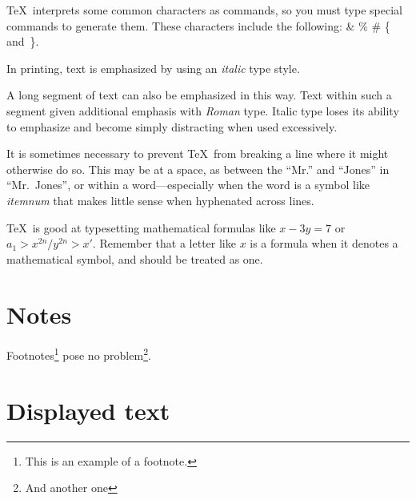 \documentclass[dvips,aoas,preprint]{imsart}
\numberwithin{equation}{section}
\theoremstyle{plain}
\begin{document}
\TeX\ interprets some common characters as commands, so you must type
special commands to generate them.  These characters include the
following:
        \& \% \# \{ and~\}.

In printing, text is emphasized by using an
       {\em italic\/}  %
type style.

\begin{em}
   A long segment of text can also be emphasized in this way.  Text within
   such a segment given additional emphasis
      with\/ {\em Roman}
   type.  Italic type loses its ability to emphasize and become simply
   distracting when used excessively.
\end{em}

It is sometimes necessary to prevent \TeX\ from breaking a line where
it might otherwise do so.  This may be at a space, as between the
``Mr.'' and ``Jones'' in
       ``Mr.~Jones'',        %
or within a word---especially when the word is a symbol like
       \mbox{\em itemnum\/}
that makes little sense when hyphenated across
       lines.

\TeX\ is good at typesetting mathematical formulas like
       \( x-3y = 7 \)
or
       \( a_{1} > x^{2n} / y^{2n} > x' \).
Remember that a letter like
       $x$        %
is a formula when it denotes a mathematical symbol, and should
be treated as one.


\section{Notes}
Footnotes\footnote{This is an example of a footnote.}
pose no problem\footnote{And another one}.

\section{Displayed text}
\end{document}
